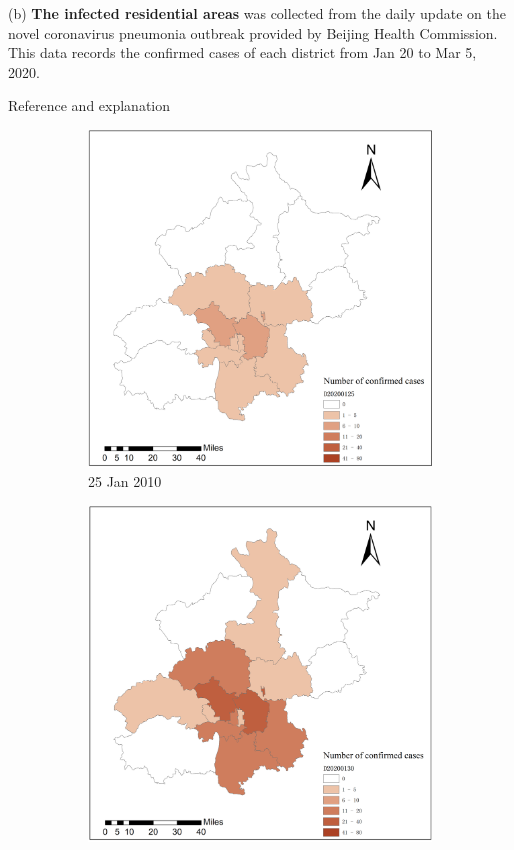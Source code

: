 \documentclass[preprints,ijgi,submit,moreauthors]{Definitions/mdpi}
\begin{document}
(b) \textbf{The infected residential areas} was collected from the daily update on the novel coronavirus pneumonia outbreak provided by Beijing Health Commission. 
This data records the confirmed cases of each district from Jan 20 to Mar 5, 2020. 

{Reference and explanation}

\begin{figure}[H]
    \begin{subfigure}{.2\textwidth}
        \includegraphics[width=\textwidth]{Figures/Plot_location_confirmed_cases(district)0125.png}
        \caption{25 Jan 2010}
    \end{subfigure}
    \begin{subfigure}{.2\textwidth}
        \includegraphics[width=\textwidth]{Figures/Plot_location_confirmed_cases(district)0130.png}

\end{subfigure}
\end{figure}
\end{document}
